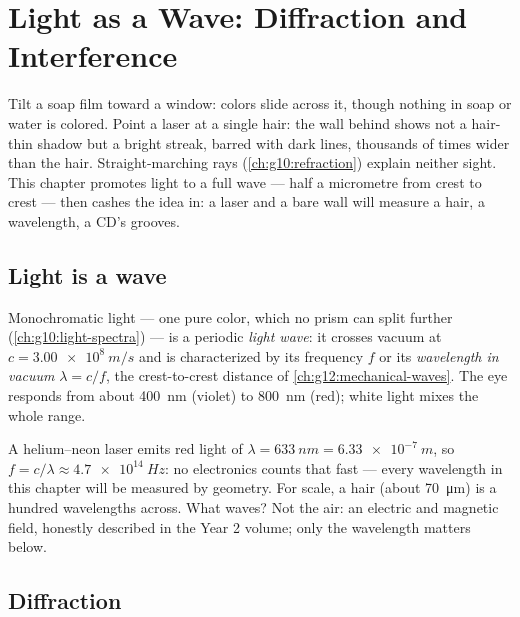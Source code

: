 \chapter{Light as a Wave: Diffraction and Interference}\label{ch:g12:light-as-wave}

Tilt a soap film toward a window: colors slide across it, though
nothing in soap or water is colored. Point a laser at a single hair:
the wall behind shows not a hair-thin shadow but a bright streak,
barred with dark lines, thousands of times wider than the hair.
Straight-marching rays (\cref{ch:g10:refraction}) explain neither
sight. This chapter promotes light to a full wave --- half a
micrometre from crest to crest --- then cashes the idea in: a laser
and a bare wall will measure a hair, a wavelength, a CD's grooves.

\section{Light is a wave}

\begin{definition}\label{def:g12:light-as-wave:lightwave}
Monochromatic light --- one pure color, which no prism can split
further (\cref{ch:g10:light-spectra}) --- is a periodic \emph{light
wave}: it crosses vacuum at $c = \qty{3.00e8}{m/s}$
and is characterized by its frequency $f$ or its \emph{wavelength in
vacuum} $\lambda = c/f$, the
crest-to-crest distance of \cref{ch:g12:mechanical-waves}. The eye
responds from about \qty{400}{nm} (violet) to \qty{800}{nm} (red);
white light mixes the whole range.
\end{definition}

\begin{example}\label{ex:g12:light-as-wave:orders}
A helium--neon laser emits red light of $\lambda = \qty{633}{nm} =
\qty{6.33e-7}{m}$, so $f = c/\lambda \approx \qty{4.7e14}{Hz}$: no
electronics counts that fast --- every wavelength in this chapter will
be measured by geometry. For scale, a hair (about \qty{70}{\micro m})
is a hundred wavelengths across. What waves? Not the air: an electric
and magnetic field, honestly described in the Year 2 volume; only the
wavelength matters below.
\end{example}

\section{Diffraction}

